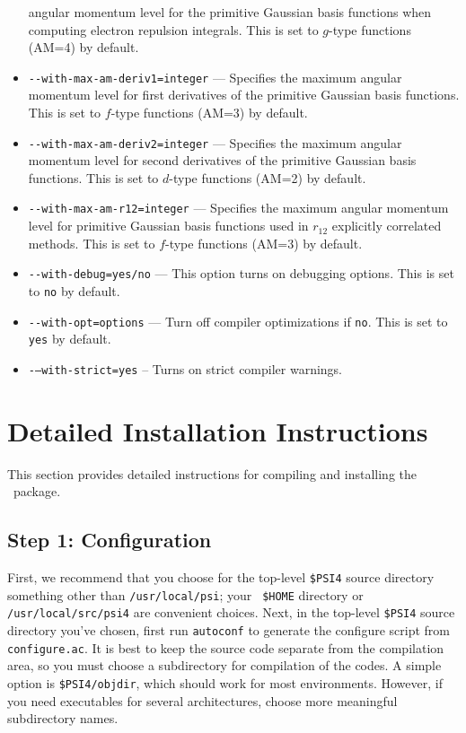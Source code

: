 \documentclass[12pt]{article}
\begin{document}
\begin{itemize}
  angular momentum level for the primitive Gaussian basis functions
  when computing electron repulsion integrals.  This is set to
  $g$-type functions (AM=4) by default.
\item {\tt -}{\tt -with-max-am-deriv1=integer} --- Specifies the maximum
  angular momentum level for first derivatives of the primitive
  Gaussian basis functions.  This is set to $f$-type functions (AM=3)
  by default.
\item {\tt -}{\tt -with-max-am-deriv2=integer} --- Specifies the maximum
  angular momentum level for second derivatives of the primitive
  Gaussian basis functions.  This is set to $d$-type functions (AM=2)
  by default.
\item {\tt -}{\tt -with-max-am-r12=integer} --- Specifies the maximum
  angular momentum level for primitive Gaussian basis functions used
  in $r_{12}$ explicitly correlated methods.  This is set to $f$-type
  functions (AM=3) by default.
\item {\tt -}{\tt -with-debug=yes/no} --- This option turns on debugging
  options.  This is set to {\tt no} by default.
\item {\tt -}{\tt -with-opt=options} --- Turn off compiler
  optimizations if {\tt no}.  This is set to {\tt yes} by default.
\item {\tt -}{\tt --with-strict=yes} -- Turns on strict compiler warnings.
\end{itemize}

\section{Detailed Installation Instructions}

This section provides detailed instructions for compiling and
installing the \PSIfour\ package.  

\subsection{Step 1: Configuration}

First, we recommend that you choose for the top-level {\tt \$PSI4}
source directory something other than {\tt /usr/local/psi}; your {\tt
  \$HOME} directory or {\tt /usr/local/src/psi4} are convenient
choices.  Next, in the top-level {\tt \$PSI4} source directory you've
chosen, first run {\tt autoconf} to generate the configure script from
{\tt configure.ac}.  It is best to keep the source code separate from
the compilation area, so you must choose a subdirectory for
compilation of the codes.  A simple option is {\tt \$PSI4/objdir},
which should work for most environments.  However, if you need
executables for several architectures, choose more meaningful
subdirectory names.
\end{document}
